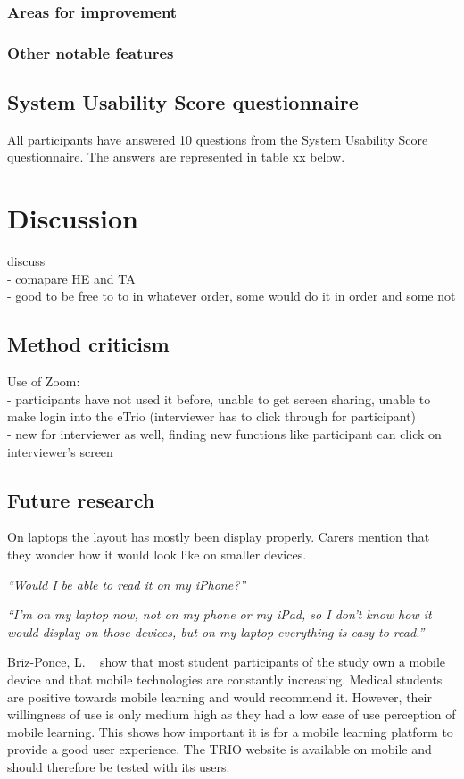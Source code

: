 \documentclass{sigchi}
\begin{document}
\subsubsection{Areas for improvement}
\subsubsection{Other notable features}


\subsection{System Usability Score questionnaire}
All participants have answered 10 questions from the System Usability Score questionnaire. The answers are represented in table xx below. 

\section{Discussion}
discuss \\
- comapare HE and TA \\
- good to be free to to in whatever order, some would do it in order and some not \\

\subsection{Method criticism}
Use of Zoom:\\
- participants have not used it before, unable to get screen sharing, unable to make login into the eTrio (interviewer has to click through for participant)\\
- new for interviewer as well, finding new functions like participant can click on interviewer's screen

\subsection{Future research}
On laptops the layout has mostly been display properly. Carers mention that they wonder how it would look like on smaller devices. 

\textit{“Would I be able to read it on my iPhone?”}

\textit{“I’m on my laptop now, not on my phone or my iPad, so I don’t know how it would display on those devices, but on my laptop everything is easy to read.”}

Briz-Ponce, L. ~\cite{Briz-Ponce2017} show that most student participants of the study own a mobile device and that mobile technologies are constantly increasing. Medical students are positive towards mobile learning and would recommend it. However, their willingness of use is only medium high as they had a low ease of use perception of mobile learning. This shows how important it is for a mobile learning platform to provide a good user experience. The TRIO website is available on mobile and should therefore be tested with its users. 
\end{document}

